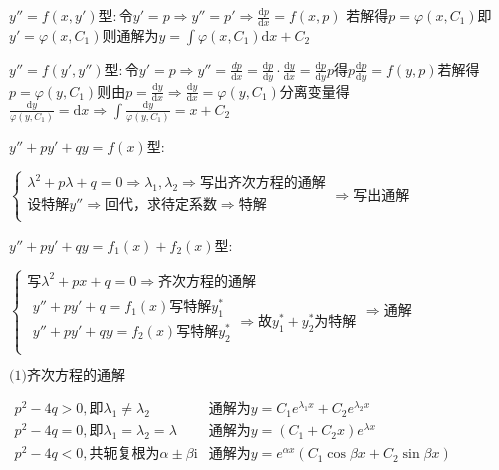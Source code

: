 \begin{spacing}{2.2}
    {\color{red} $y''=f(x, y')$}型$\colon$令$y' = p \Rightarrow y'' = p' \Rightarrow \frac{\mathrm{d}p}{\mathrm{d}x} = f(x, p)$
    若解得$p = \varphi(x, C_1)$即$y' = \varphi(x, C_1)$则通解为$\displaystyle y = \int{\varphi(x, C_1)\mathrm{d}x} +C_2$

    {\color{red} $y''=f(y', y'')$}型$\colon$令$y' = p \Rightarrow y'' = \frac{\mathrm{}{d}p}{\mathrm{d}x} = \frac{\mathrm{d}p}{\mathrm{d}y} \cdot \frac{\mathrm{d}y}{\mathrm{d}x} = \frac{\mathrm{d}p}{\mathrm{d}y}p$得$p\frac{\mathrm{d}p}{\mathrm{d}y} = f(y, p)$若解得$p = \varphi(y, C_1)$则由$p = \frac{\mathrm{d}y}{\mathrm{d}x} \Rightarrow \frac{\mathrm{d}y}{\mathrm{d}x} = \varphi(y, C_1)$分离变量得$\displaystyle \frac{\mathrm{d}y}{\varphi(y, C_1)} = \mathrm{d}x \Rightarrow \int{\frac{\mathrm{d}y}{\varphi(y, C_1)}} = x + C_2$

    {\color{red} $y'' + py' + qy = f(x)$}型$\colon$

    \noindent $\left\{
        \begin{array}{l}
            \lambda^2 + p\lambda + q = 0 \Rightarrow \lambda_1, \lambda_2 \Rightarrow \mbox{写出齐次方程的通解}\\
            \mbox{设特解}y'' \Rightarrow \mbox{回代，求待定系数} \Rightarrow \mbox{特解} \\
        \end{array}
    \right.
    \Rightarrow \mbox{写出通解}$

    {\color{red} $y'' + py' + qy = f_1(x) + f_2(x)$}型$\colon$

    \noindent $\left\{
        \begin{array}{l}
            \mbox{写}\lambda^2 + px + q = 0 \Rightarrow \mbox{齐次方程的通解} \\
            \begin{array}{l}
                y'' + py' + q = f_1(x) \mbox{写特解}y_{1}^{*} \\
                y'' + py' + qy = f_2(x) \mbox{写特解}y_{2}^{*} \\
            \end{array} \Rightarrow \mbox{故}y_{1}^{*} + y_{2}^{*}\mbox{为特解}
        \end{array}
    \right. \Rightarrow \mbox{通解}$

    \noindent $\mbox{(1)齐次方程的通解}$

    \noindent $\begin{array}{ll}
        p^2-4q > 0,\mbox{即} \lambda_1 \neq \lambda_2 & \mbox{通解为}y = C_1e^{\lambda_1x} + C_2e^{\lambda_2x}\\
        p^2-4q = 0,\mbox{即} \lambda_1 = \lambda_2 = \lambda & \mbox{通解为}y = (C_1 + C_2x)e^{\lambda x}\\
        p^2-4q < 0,\mbox{共轭复根为}\alpha \pm \beta \mathrm{i} & \mbox{通解为}y = e^{\alpha x}(C_1\cos{\beta x} + C_2\sin{\beta x})\\
    \end{array}$


\end{spacing}
